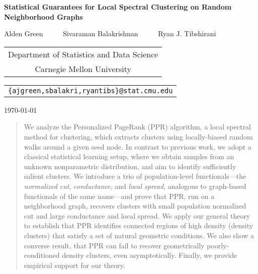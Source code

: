 \documentclass[11pt,twoside]{article}
\theoremstyle{definition}
\newcommand{\1}{\mathbf{1}}
\begin{document}
\begin{center} {\Large{\bf{Statistical Guarantees for Local Spectral Clustering on Random Neighborhood Graphs}}}

\vspace*{.3cm}

{\large{
\begin{center}
Alden Green~~~~~ Sivaraman Balakrishnan~~~~~ Ryan J. Tibshirani\\
\vspace{.2cm}
\end{center}


\begin{tabular}{c}
Department of Statistics and Data Science \\
Carnegie Mellon University
\end{tabular}

\vspace*{.2in}

\begin{tabular}{c}
\texttt{\{ajgreen,sbalakri,ryantibs\}@stat.cmu.edu}
\end{tabular}
}}

\vspace*{.2in}

\today
\vspace*{.2in}
\end{center}

\begin{abstract}
	We analyze the Personalized PageRank (PPR) algorithm, a local spectral method
	for clustering, which extracts clusters using locally-biased random walks around
	a given seed node.  In contrast to previous work, we adopt a classical
	statistical learning setup, where we obtain samples from an unknown nonparametric distribution, and aim to identify sufficiently salient clusters.  We introduce a trio of population-level functionals---the \emph{normalized cut}, \emph{conductance}, and \emph{local spread}, analogous to graph-based functionals of the same name---and prove that PPR, run on a neighborhood graph, recovers clusters with small population normalized cut and large conductance and local spread. We apply our general theory to establish that PPR identifies connected regions of high density (density clusters) that satisfy a set of natural geometric conditions. We also show a converse result, that PPR can fail to recover
	geometrically poorly-conditioned density clusters, even asymptotically. Finally,
	we provide empirical support for our theory.
\end{abstract}
\end{document}
